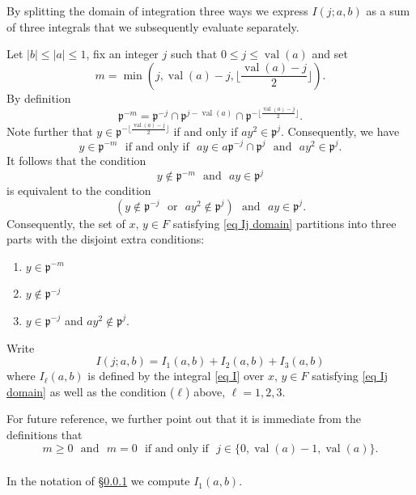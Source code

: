\documentclass[12pt]{amsart}
\newcommand{\abs}[1]{\left|{#1}\right|}
\newcommand{\p}{\mathfrak{p}}
\newcommand{\val}{{\operatorname{val}}}
\theoremstyle{remark}
\begin{document}
\subsubsection{}\label{ss split dom} By splitting the domain of integration three ways we express $I(j;a,b)$ as a sum of three integrals that we subsequently evaluate separately.

Let $\abs{b}\le \abs{a}\le 1$, fix an integer $j$ such that $0\le j\le \val(a)$ and set
\[
m=\min(j,\val(a)-j,\lfloor \frac{\val(a)-j}2 \rfloor).
\] 
By definition 
\[
\p^{-m}= \p^{-j}\cap \p^{j-\val(a)}\cap \p^{-\lfloor \frac{\val(a)-j}2 \rfloor}. 
\]
Note further that $y\in \p^{-\lfloor \frac{\val(a)-j}2 \rfloor}$ if and only if $ay^2\in\p^j$. Consequently, we have 
\begin{equation}\label{eq in m dom}
y\in \p^{-m}\ \ \ \text{if and only if}\ \ \ ay\in a\p^{-j}\cap \p^j\ \ \ \text{and} \ \ \ ay^2\in \p^j. 
\end{equation}
It follows that the condition 
\[
y\not\in \p^{-m}\ \ \  \text{and}\ \ \ ay\in \p^j
\] 
is equivalent to the condition
\[
(y\not\in \p^{-j}\ \ \ \text{or}\ \ \ ay^2\not\in \p^j)\ \ \ \text{and}\ \ \ ay\in \p^j.
\] 
Consequently, the set of $x,\,y\in F$ satisfying \eqref{eq Ij domain} partitions into three parts with the disjoint extra conditions:
\begin{enumerate}
\item\label{cond in pm} $y\in \p^{-m}$
\item\label{cond not in pj} $y\not\in \p^{-j}$
\item\label{cond the rest} $y\in \p^{-j}$ and $ay^2\not\in \p^j$.
\end{enumerate}


Write 
\[
I(j;a,b)=I_1(a,b)+I_2(a,b)+I_3(a,b)
\]
where $I_\ell(a,b)$ is defined by the integral \eqref{eq I} over $x,\,y\in F$ satisfying \eqref{eq Ij domain} as well as the condition ($\ell$) above, $\ell=1,2,3$. 

For future reference, we further point out that it is immediate from the definitions that
\begin{equation}\label{eq m prop}
m\ge 0\ \ \ \text{and}\ \ \ m=0\ \ \ \text{if and only if}\ \ \ j\in \{0,\val(a)-1,\val(a)\}.
\end{equation}






\subsubsection{} In the notation of \S\ref{ss split dom} we compute $I_1(a,b)$.
\end{document}

